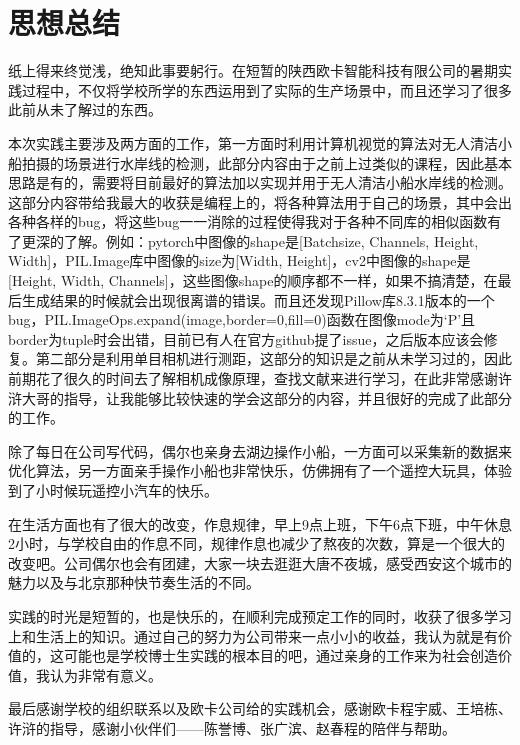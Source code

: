 \documentclass[cn,12pt,color=mine,scheme=chinese,bibstyle=gb7714-2015]{elegantbook}
\begin{document}
\chapter*{思想总结}
纸上得来终觉浅，绝知此事要躬行。在短暂的陕西欧卡智能科技有限公司的暑期实践过程中，不仅将学校所学的东西运用到了实际的生产场景中，而且还学习了很多此前从未了解过的东西。

本次实践主要涉及两方面的工作，第一方面时利用计算机视觉的算法对无人清洁小船拍摄的场景进行水岸线的检测，此部分内容由于之前上过类似的课程，因此基本思路是有的，需要将目前最好的算法加以实现并用于无人清洁小船水岸线的检测。这部分内容带给我最大的收获是编程上的，将各种算法用于自己的场景，其中会出各种各样的bug，将这些bug一一消除的过程使得我对于各种不同库的相似函数有了更深的了解。例如：pytorch中图像的shape是[Batchsize, Channels, Height, Width]，PIL.Image库中图像的size为[Width, Height]，cv2中图像的shape是[Height, Width, Channels]，这些图像shape的顺序都不一样，如果不搞清楚，在最后生成结果的时候就会出现很离谱的错误。而且还发现Pillow库8.3.1版本的一个bug，PIL.ImageOps.expand(image,border=0,fill=0)函数在图像mode为`P'且border为tuple时会出错，目前已有人在官方github提了issue，之后版本应该会修复。第二部分是利用单目相机进行测距，这部分的知识是之前从未学习过的，因此前期花了很久的时间去了解相机成像原理，查找文献来进行学习，在此非常感谢许浒大哥的指导，让我能够比较快速的学会这部分的内容，并且很好的完成了此部分的工作。

除了每日在公司写代码，偶尔也亲身去湖边操作小船，一方面可以采集新的数据来优化算法，另一方面亲手操作小船也非常快乐，仿佛拥有了一个遥控大玩具，体验到了小时候玩遥控小汽车的快乐。

在生活方面也有了很大的改变，作息规律，早上9点上班，下午6点下班，中午休息2小时，与学校自由的作息不同，规律作息也减少了熬夜的次数，算是一个很大的改变吧。公司偶尔也会有团建，大家一块去逛逛大唐不夜城，感受西安这个城市的魅力以及与北京那种快节奏生活的不同。

实践的时光是短暂的，也是快乐的，在顺利完成预定工作的同时，收获了很多学习上和生活上的知识。通过自己的努力为公司带来一点小小的收益，我认为就是有价值的，这可能也是学校博士生实践的根本目的吧，通过亲身的工作来为社会创造价值，我认为非常有意义。

最后感谢学校的组织联系以及欧卡公司给的实践机会，感谢欧卡程宇威、王培栋、许浒的指导，感谢小伙伴们——陈誉博、张广滨、赵春程的陪伴与帮助。


\printbibliography[heading=bibintoc]
	
\end{document}

